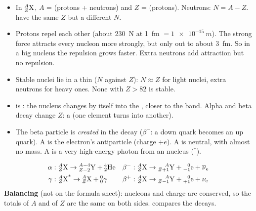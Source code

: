 \begin{keywords}
\end{keywords}

\begin{itemize}
  \item In $\chFourNuc{A}{Z}{X}$, $A$ =  (protons + neutrons) and $Z$ =
         (protons). Neutrons: $N = A - Z$.  have the same
        $Z$ but a different $N$.
  \item Protons repel each other (about \qty{230}{N} at \qty{1}{fm} $= \qty{1e-15}{m}$). The strong force
        attracts every nucleon more strongly, but only out to about \qty{3}{fm}. So in a big
        nucleus the repulsion grows faster. Extra neutrons add attraction but no repulsion.
  \item Stable nuclei lie in a thin  ($N$ against $Z$): $N \approx Z$
        for light nuclei, extra neutrons for heavy ones. None with $Z > 82$ is stable.
  \item {} is : the  nucleus changes by
        itself into the , closer to the band. Alpha and beta decay change $Z$:
        a  (one element turns into another).
  \item The beta particle is \emph{created} in the decay ($\beta^-$: a down quark becomes an
        up quark). A  is the electron's antiparticle (charge $+e$). A
         is neutral, with almost no mass. A  is a very
        high-energy photon from an  nucleus ($^{*}$).
\end{itemize}
\begin{align*}
  \alpha:\ & \chFourNuc{A}{Z}{X} \to \chFourNuc{A-4}{Z-2}{Y} + \chFourAlpha &
  \beta^-:\ & \chFourNuc{A}{Z}{X} \to \chFourNuc{A}{Z+1}{Y} + \chFourBeta + \chFourAnu\\
  \gamma:\ & \chFourNuc{A}{Z}{X}^{*} \to \chFourNuc{A}{Z}{X} + \chFourGam &
  \beta^+:\ & \chFourNuc{A}{Z}{X} \to \chFourNuc{A}{Z-1}{Y} + \chFourPos + \chFourNu
\end{align*}
\textbf{Balancing} (not on the formula sheet): nucleons and charge are conserved, so the
totals of $A$ and of $Z$ are the same on both sides.  compares the decays.

